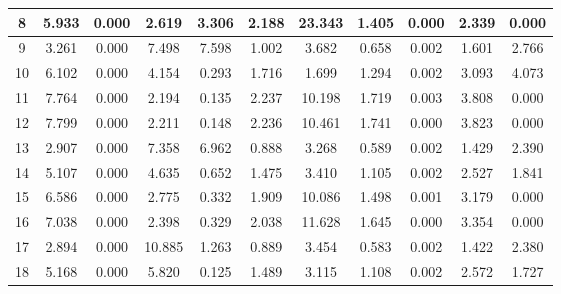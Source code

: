 \begin{table}[]
\begin{tabular}{|c|cc|cc|cc|cc|cc|}
8 & 5.933 & \cellcolor[HTML]{EFEFEF}0.000 & 2.619 & \cellcolor[HTML]{EFEFEF}3.306 & 2.188 & \cellcolor[HTML]{EFEFEF}23.343 & 1.405 & \cellcolor[HTML]{EFEFEF}0.000 & 2.339 & \cellcolor[HTML]{EFEFEF}0.000 \\ \hline
9 & 3.261 & \cellcolor[HTML]{EFEFEF}0.000 & 7.498 & \cellcolor[HTML]{EFEFEF}7.598 & 1.002 & \cellcolor[HTML]{EFEFEF}3.682 & 0.658 & \cellcolor[HTML]{EFEFEF}0.002 & 1.601 & \cellcolor[HTML]{EFEFEF}2.766 \\ \hline
10 & 6.102 & \cellcolor[HTML]{EFEFEF}0.000 & 4.154 & \cellcolor[HTML]{EFEFEF}0.293 & 1.716 & \cellcolor[HTML]{EFEFEF}1.699 & 1.294 & \cellcolor[HTML]{EFEFEF}0.002 & 3.093 & \cellcolor[HTML]{EFEFEF}4.073 \\ \hline
11 & 7.764 & \cellcolor[HTML]{EFEFEF}0.000 & 2.194 & \cellcolor[HTML]{EFEFEF}0.135 & 2.237 & \cellcolor[HTML]{EFEFEF}10.198 & 1.719 & \cellcolor[HTML]{EFEFEF}0.003 & 3.808 & \cellcolor[HTML]{EFEFEF}0.000 \\ \hline
12 & 7.799 & \cellcolor[HTML]{EFEFEF}0.000 & 2.211 & \cellcolor[HTML]{EFEFEF}0.148 & 2.236 & \cellcolor[HTML]{EFEFEF}10.461 & 1.741 & \cellcolor[HTML]{EFEFEF}0.000 & 3.823 & \cellcolor[HTML]{EFEFEF}0.000 \\ \hline
13 & 2.907 & \cellcolor[HTML]{EFEFEF}0.000 & 7.358 & \cellcolor[HTML]{EFEFEF}6.962 & 0.888 & \cellcolor[HTML]{EFEFEF}3.268 & 0.589 & \cellcolor[HTML]{EFEFEF}0.002 & 1.429 & \cellcolor[HTML]{EFEFEF}2.390 \\ \hline
14 & 5.107 & \cellcolor[HTML]{EFEFEF}0.000 & 4.635 & \cellcolor[HTML]{EFEFEF}0.652 & 1.475 & \cellcolor[HTML]{EFEFEF}3.410 & 1.105 & \cellcolor[HTML]{EFEFEF}0.002 & 2.527 & \cellcolor[HTML]{EFEFEF}1.841 \\ \hline
15 & 6.586 & \cellcolor[HTML]{EFEFEF}0.000 & 2.775 & \cellcolor[HTML]{EFEFEF}0.332 & 1.909 & \cellcolor[HTML]{EFEFEF}10.086 & 1.498 & \cellcolor[HTML]{EFEFEF}0.001 & 3.179 & \cellcolor[HTML]{EFEFEF}0.000 \\ \hline
16 & 7.038 & \cellcolor[HTML]{EFEFEF}0.000 & 2.398 & \cellcolor[HTML]{EFEFEF}0.329 & 2.038 & \cellcolor[HTML]{EFEFEF}11.628 & 1.645 & \cellcolor[HTML]{EFEFEF}0.000 & 3.354 & \cellcolor[HTML]{EFEFEF}0.000 \\ \hline
17 & 2.894 & \cellcolor[HTML]{EFEFEF}0.000 & 10.885 & \cellcolor[HTML]{EFEFEF}1.263 & 0.889 & \cellcolor[HTML]{EFEFEF}3.454 & 0.583 & \cellcolor[HTML]{EFEFEF}0.002 & 1.422 & \cellcolor[HTML]{EFEFEF}2.380 \\ \hline
18 & 5.168 & \cellcolor[HTML]{EFEFEF}0.000 & 5.820 & \cellcolor[HTML]{EFEFEF}0.125 & 1.489 & \cellcolor[HTML]{EFEFEF}3.115 & 1.108 & \cellcolor[HTML]{EFEFEF}0.002 & 2.572 & \cellcolor[HTML]{EFEFEF}1.727 \\ \hline

\end{tabular}
\end{table}
